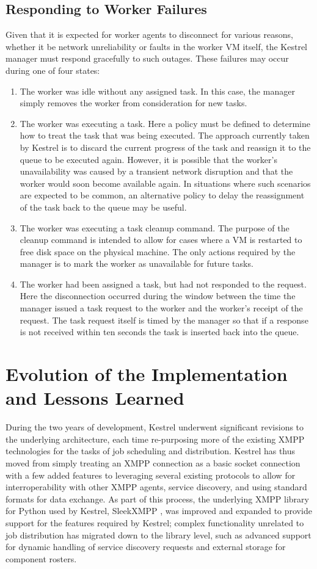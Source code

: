 \subsection{Responding to Worker Failures}
Given that it is expected for worker agents to disconnect for various reasons,
whether it be network unreliability or faults in the worker VM itself, the
Kestrel manager must respond gracefully to such outages. These failures
may occur during one of four states:
\begin{enumerate}
\item The worker was idle without any assigned task. In this case, the manager
simply removes the worker from consideration for new tasks.
\item The worker was executing a task. Here a policy must be defined to
determine how to treat the task that was being executed. The approach currently
taken by Kestrel is to discard the current progress of the task and reassign it
to the queue to be executed again. However, it is possible that
the worker's unavailability was caused by a transient network disruption and
that the worker would soon become available again. In situations where such
scenarios are expected to be common, an alternative policy to delay the reassignment
of the task back to the queue may be useful.
\item The worker was executing a task cleanup command. The purpose of the cleanup
command is intended to allow for cases where a VM is restarted to free
disk space on the physical machine. The only actions required by the manager is to
mark the worker as unavailable for future tasks.
\item The worker had been assigned a task, but had not responded to the request. Here
the disconnection occurred during the window between the time the manager issued a 
task request to the worker and the worker's receipt of the request. The task request
itself is timed by the manager so that if a response is not received within ten
seconds the task is inserted back into the queue.
\end{enumerate}

\section{Evolution of the Implementation and Lessons Learned}
\label{sec:Evolution}
During the two years of development, Kestrel underwent significant revisions
to the underlying architecture, each time re-purposing more of the existing
XMPP technologies for the tasks of job scheduling and distribution. Kestrel has
thus moved from simply treating an XMPP connection as a basic socket connection
with a few added features to leveraging several existing protocols to allow
for interroperability with other XMPP agents, service discovery, and using
standard formats for data exchange. As part of this process, the underlying XMPP
library for Python used by Kestrel, SleekXMPP \cite{SleekXMPP}, was improved
and expanded to provide support for the features required by Kestrel; complex
functionality unrelated to job distribution has migrated down to the library
level, such as advanced support for dynamic handling of service discovery
requests and external storage for component rosters.


